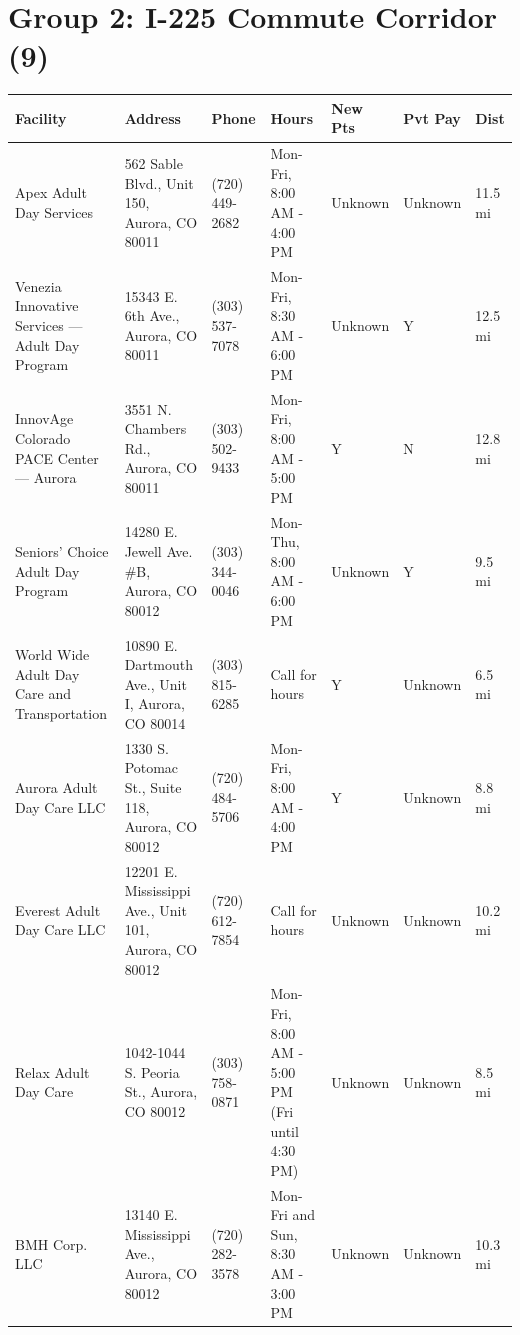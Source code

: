 \documentclass[11pt,landscape]{article}
\begin{document}
\section*{Group 2: I-225 Commute Corridor (9)}
\begin{longtable}{p{3.5cm}p{4cm}p{2.2cm}p{3cm}p{1.5cm}p{1.5cm}p{1.2cm}}
\toprule
Facility & Address & Phone & Hours & New Pts & Pvt Pay & Dist \\
\midrule
\endhead
Apex Adult Day Services & 562 Sable Blvd., Unit 150, Aurora, CO 80011 & (720) 449-2682 & Mon-Fri, 8:00 AM - 4:00 PM & Unknown & Unknown & 11.5 mi \\
Venezia Innovative Services — Adult Day Program & 15343 E. 6th Ave., Aurora, CO 80011 & (303) 537-7078 & Mon-Fri, 8:30 AM - 6:00 PM & Unknown & Y & 12.5 mi \\
InnovAge Colorado PACE Center — Aurora & 3551 N. Chambers Rd., Aurora, CO 80011 & (303) 502-9433 & Mon-Fri, 8:00 AM - 5:00 PM & Y & N & 12.8 mi \\
Seniors' Choice Adult Day Program & 14280 E. Jewell Ave. \#B, Aurora, CO 80012 & (303) 344-0046 & Mon-Thu, 8:00 AM - 6:00 PM & Unknown & Y & 9.5 mi \\
World Wide Adult Day Care and Transportation & 10890 E. Dartmouth Ave., Unit I, Aurora, CO 80014 & (303) 815-6285 & Call for hours & Y & Unknown & 6.5 mi \\
Aurora Adult Day Care LLC & 1330 S. Potomac St., Suite 118, Aurora, CO 80012 & (720) 484-5706 & Mon-Fri, 8:00 AM - 4:00 PM & Y & Unknown & 8.8 mi \\
Everest Adult Day Care LLC & 12201 E. Mississippi Ave., Unit 101, Aurora, CO 80012 & (720) 612-7854 & Call for hours & Unknown & Unknown & 10.2 mi \\
Relax Adult Day Care & 1042-1044 S. Peoria St., Aurora, CO 80012 & (303) 758-0871 & Mon-Fri, 8:00 AM - 5:00 PM (Fri until 4:30 PM) & Unknown & Unknown & 8.5 mi \\
BMH Corp. LLC & 13140 E. Mississippi Ave., Aurora, CO 80012 & (720) 282-3578 & Mon-Fri and Sun, 8:30 AM - 3:00 PM & Unknown & Unknown & 10.3 mi \\
\bottomrule
\end{longtable}
\end{document}
